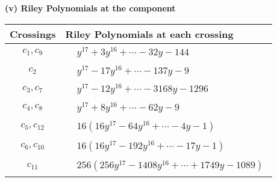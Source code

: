 \documentclass[1p]{elsarticle_modified}
\theoremstyle{definition}
\begin{document}
\newpage\renewcommand{\arraystretch}{1}
\flushleft \textbf{(v) Riley Polynomials at the component}\newline \\
\begin{tabular}{m{50pt}|m{274pt}}
Crossings & \hspace{64pt}Riley Polynomials at each crossing \\
\hline $$\begin{aligned}c_{1},c_{9}\end{aligned}$$&$\begin{aligned}
&y^{17}+3 y^{16}+\cdots-32 y-144
\end{aligned}$\\
\hline $$\begin{aligned}c_{2}\end{aligned}$$&$\begin{aligned}
&y^{17}-17 y^{16}+\cdots-137 y-9
\end{aligned}$\\
\hline $$\begin{aligned}c_{3},c_{7}\end{aligned}$$&$\begin{aligned}
&y^{17}-12 y^{16}+\cdots-3168 y-1296
\end{aligned}$\\
\hline $$\begin{aligned}c_{4},c_{8}\end{aligned}$$&$\begin{aligned}
&y^{17}+8 y^{16}+\cdots-62 y-9
\end{aligned}$\\
\hline $$\begin{aligned}c_{5},c_{12}\end{aligned}$$&$\begin{aligned}
&16(16 y^{17}-64 y^{16}+\cdots-4 y-1)
\end{aligned}$\\
\hline $$\begin{aligned}c_{6},c_{10}\end{aligned}$$&$\begin{aligned}
&16(16 y^{17}-192 y^{16}+\cdots-17 y-1)
\end{aligned}$\\
\hline $$\begin{aligned}c_{11}\end{aligned}$$&$\begin{aligned}
&256(256 y^{17}-1408 y^{16}+\cdots+1749 y-1089)
\end{aligned}$\\
\hline
\end{tabular}\\~\\
\end{document}
